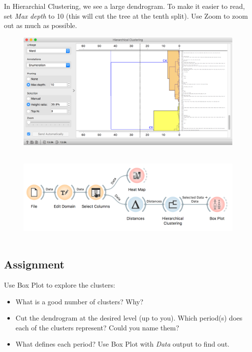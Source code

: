 In Hierarchial Clustering, we see a large dendrogram. To make it easier to read, set \textit{Max depth} to 10 (this will cut the tree at the tenth split). Use Zoom to zoom out as much as possible.

\begin{figure}[h]
    \centering
    \includegraphics[scale=0.45]{hierarchical-clustering.png}
    \caption{$\;$} %
\end{figure}

\newpage

\begin{figure}[h]
    \centering
    \includegraphics[scale=0.6]{workflow.png}
    \caption{$\;$} %
\end{figure}

\subsection{Assignment}

Use Box Plot to explore the clusters:
\begin{itemize}
    \item What is a good number of clusters? Why?
    \item Cut the dendrogram at the desired level (up to you). Which period(s) does each of the clusters represent? Could you name them?
    \item What defines each period? Use Box Plot with \textit{Data} output to find out.
\end{itemize}
